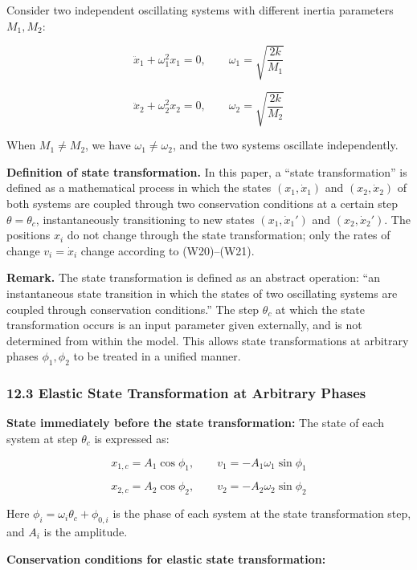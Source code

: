 \documentclass[a4paper,11pt]{article}
\begin{document}
Consider two independent oscillating systems with different inertia
parameters \(M_1, M_2\):

\[\ddot{x}_1 + \omega_1^2 x_1 = 0, \qquad \omega_1 = \sqrt{\frac{2k}{M_1}} \tag{W14}\]

\[\ddot{x}_2 + \omega_2^2 x_2 = 0, \qquad \omega_2 = \sqrt{\frac{2k}{M_2}} \tag{W15}\]

When \(M_1 \neq M_2\), we have \(\omega_1 \neq \omega_2\), and the two
systems oscillate independently.

\textbf{Definition of state transformation.} In this paper, a ``state
transformation'' is defined as a mathematical process in which the
states \((x_1, \dot{x}_1)\) and \((x_2, \dot{x}_2)\) of both systems are
coupled through two conservation conditions at a certain step
\(\theta = \theta_c\), instantaneously transitioning to new states
\((x_1, \dot{x}_1')\) and \((x_2, \dot{x}_2')\). The positions \(x_i\)
do not change through the state transformation; only the rates of change
\(v_i = \dot{x}_i\) change according to (W20)--(W21).

\textbf{Remark.} The state transformation is defined as an abstract
operation: ``an instantaneous state transition in which the states of
two oscillating systems are coupled through conservation conditions.''
The step \(\theta_c\) at which the state transformation occurs is an
input parameter given externally, and is not determined from within the
model. This allows state transformations at arbitrary phases
\(\phi_1, \phi_2\) to be treated in a unified manner.

\subsubsection{12.3 Elastic State Transformation at Arbitrary
Phases}\label{elastic-state-transformation-at-arbitrary-phases}

\textbf{State immediately before the state transformation:} The state of
each system at step \(\theta_c\) is expressed as:

\[x_{1,c} = A_1\cos\phi_1, \qquad v_1 = -A_1\omega_1\sin\phi_1 \tag{W16}\]

\[x_{2,c} = A_2\cos\phi_2, \qquad v_2 = -A_2\omega_2\sin\phi_2 \tag{W17}\]

Here \(\phi_i = \omega_i\theta_c + \phi_{0,i}\) is the phase of each
system at the state transformation step, and \(A_i\) is the amplitude.

\textbf{Conservation conditions for elastic state transformation:}
\end{document}
